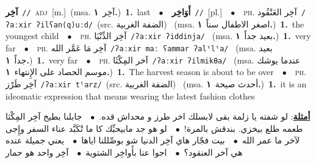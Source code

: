 \documentclass[10pt,a4paper,twoside]{article} %
\begin{document}
\begin{multicols}{2}
{{{{{{{{\setlength\topsep{0pt}\textbf{\foreignlanguage{arabic}{آخِر}}\ {\color{gray}\texttt{//}\color{black}}\ \textsc{adj}\ [m.]\ \color{gray}(msa. \foreignlanguage{arabic}{آخِر}~\foreignlanguage{arabic}{\textbf{١.}})\color{black}\ \textbf{1.}~last\ \ $\bullet$\ \ \setlength\topsep{0pt}\textbf{\foreignlanguage{arabic}{أَوَاخِر}}\ {\color{gray}\texttt{//}\color{black}}\ [pl.]\ \ $\bullet$\ \ \textsc{ph.} \color{gray} \foreignlanguage{arabic}{آخِر العَنْقُود}\color{black}\ {\color{gray}\texttt{/{\sffamily ʔaːxir ʔilʕan(q)uːd}/}\color{black}}\ \color{gray}(src. \foreignlanguage{arabic}{الضفة الغربية})\color{black}\ \color{gray} (msa. \foreignlanguage{arabic}{اصغر الاطفال سناً}~\foreignlanguage{arabic}{\textbf{١.}})\color{black}\ \textbf{1.}~the youngest child\ \ $\bullet$\ \ \textsc{ph.} \color{gray} \foreignlanguage{arabic}{آخِر الدِّنْيَا}\color{black}\ {\color{gray}\texttt{/{\sffamily ʔaːxir ʔiddinja}/}\color{black}}\ \color{gray} (msa. \foreignlanguage{arabic}{بعيد جداً}~\foreignlanguage{arabic}{\textbf{١.}})\color{black}\ \textbf{1.}~very far\ \ $\bullet$\ \ \textsc{ph.} \color{gray} \foreignlanguage{arabic}{آخِر مَا عَمَّر الله}\color{black}\ {\color{gray}\texttt{/{\sffamily ʔaːxir maː ʕammar ʔalˤlˤa}/}\color{black}}\ \color{gray} (msa. \foreignlanguage{arabic}{بعيد جداً}~\foreignlanguage{arabic}{\textbf{١.}})\color{black}\ \textbf{1.}~very far\ \ $\bullet$\ \ \textsc{ph.} \color{gray} \foreignlanguage{arabic}{آخر المِكْثَا}\color{black}\ {\color{gray}\texttt{/{\sffamily ʔaːxir ʔilmikθa}/}\color{black}}\ \color{gray} (msa. \foreignlanguage{arabic}{عندما يوشك موسم الحصاد على الإِنتهاء}~\foreignlanguage{arabic}{\textbf{١.}})\color{black}\ \textbf{1.}~The harvest season is about to be over\ \ $\bullet$\ \ \textsc{ph.} \color{gray} \foreignlanguage{arabic}{آخِر طَرْز}\color{black}\ {\color{gray}\texttt{/{\sffamily ʔaːxir tˤarz}/}\color{black}}\ \color{gray}(src. \foreignlanguage{arabic}{الضفة الغربية})\color{black}\ \color{gray} (msa. \foreignlanguage{arabic}{أحدث صيحة}~\foreignlanguage{arabic}{\textbf{١.}})\color{black}\ \textbf{1.}~it is an ideomatic expression that means wearing the latest fashion clothes\  \begin{flushright}\color{gray}\foreignlanguage{arabic}{\textbf{\underline{\foreignlanguage{arabic}{أمثلة}}}: لو شفته يا زلمة بقى لابسلك اخر طرز و محداش قده.\ $\bullet$\ \  جابلنا بطيخ آخِر المِكْثا طعمه طلع بيخزي. بندقش بالمرة!\ $\bullet$\ \  لو هو جد مابيحبِّك كا ما تْكَبَّد عناء السفر وإِجى لآخر ما عمر الله\ $\bullet$\ \  بيت فجّار هاي آخِر الدنيا شو بوصِّللنا اياها\ $\bullet$\ \  يعني جميلة عنده هي آخر العنقود؟\ $\bullet$\ \  اجوا عنا بأَواخِر الشتوية\ $\bullet$\ \  آخِر واحد هو حمار}\end{flushright}\color{black}} \vspace{2mm}

}}}}}}}
\end{multicols}
\end{document}
